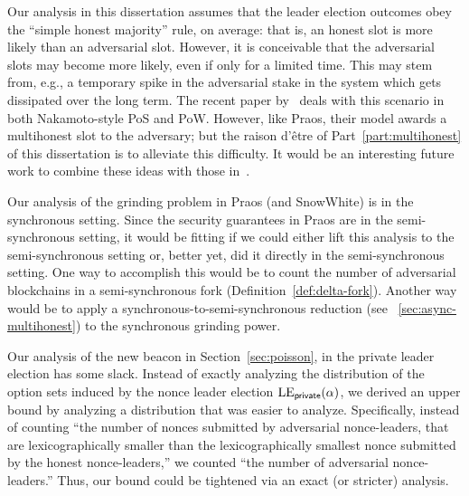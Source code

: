 Our analysis in this dissertation assumes that the leader election outcomes obey 
the ``simple honest majority'' rule, on average: 
that is, an honest slot is more likely than an adversarial slot. 
However, it is conceivable that the adversarial slots may become more likely, even if only for a limited time. 
This may stem from, e.g., a temporary spike in the adversarial stake in the system 
which gets dissipated over the long term. 
The recent paper by~\citet{AdversarialSupremacy} deals with this scenario in both Nakamoto-style PoS and PoW. 
However, like Praos, their model awards a multihonest slot to the adversary; 
but the raison d'\^{e}tre of Part~\ref{part:multihonest} of this dissertation 
is to alleviate this difficulty.
It would be an interesting future work to combine these ideas with those in~\cite{AdversarialSupremacy}.

Our analysis of the grinding problem in Praos (and SnowWhite) 
is in the synchronous setting. 
Since the security guarantees in Praos are in the semi-synchronous setting, 
it would be fitting if we could either lift this analysis to the semi-synchronous setting 
or, better yet, did it directly in the semi-synchronous setting. 
One way to accomplish this would be to 
count the number of adversarial blockchains in a semi-synchronous fork (Definition~\ref{def:delta-fork}). 
Another way would be to apply a synchronous-to-semi-synchronous reduction (see \Section~\ref{sec:async-multihonest})
to the synchronous grinding power.


Our analysis of the new beacon in Section~\ref{sec:poisson}, 
in the private leader election 
has some slack. 
Instead of exactly analyzing 
the distribution of the option sets 
induced by the nonce leader election $\mathrm{LE}_\mathsf{private}(\alpha)$, 
we derived an upper bound by analyzing a distribution 
that was easier to analyze. 
Specifically, 
instead of counting ``the number of nonces submitted by adversarial nonce-leaders, 
that are lexicographically smaller than 
the lexicographically smallest nonce submitted by the honest nonce-leaders,'' 
we counted ``the number of adversarial nonce-leaders.'' 
Thus, our bound could be tightened via an exact (or stricter) analysis.







